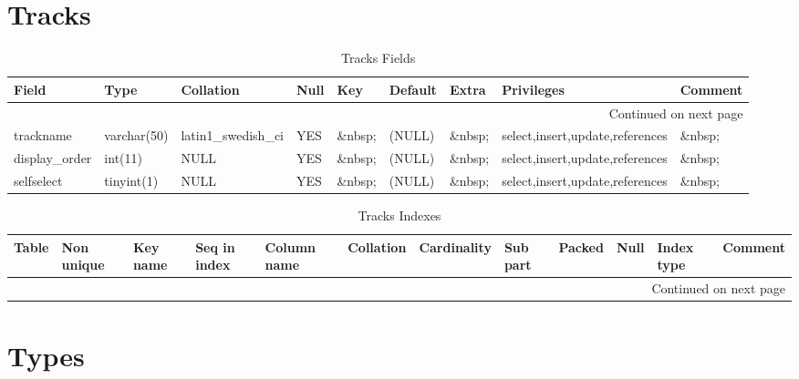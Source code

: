 \documentclass[tablesignature,landscape]{scrartcl}
\begin{document}
\section{Tracks}
\label{sec-32}


\begin{longtable}{|l|l|l|l|l|l|l|l|l|}
\caption{Tracks Fields} \label{tbl:tracksfields}\\
\hline
 Field             &  Type         &  Collation                &  Null     &  Key      &  Default  &  Extra              &  Privileges                       &  Comment \\
\hline
\endhead
\hline\multicolumn{9}{r}{Continued on next page}\
\endfoot
\endlastfoot
\hline
 trackid           &  int(11)      &  NULL                     &  \&nbsp;  &  PRI      &  (NULL)   &  auto\_{}increment  &  select,insert,update,references  &  \&nbsp;  \\
 trackname         &  varchar(50)  &  latin1\_{}swedish\_{}ci  &  YES      &  \&nbsp;  &  (NULL)   &  \&nbsp;            &  select,insert,update,references  &  \&nbsp;  \\
 display\_{}order  &  int(11)      &  NULL                     &  YES      &  \&nbsp;  &  (NULL)   &  \&nbsp;            &  select,insert,update,references  &  \&nbsp;  \\
 selfselect        &  tinyint(1)   &  NULL                     &  YES      &  \&nbsp;  &  (NULL)   &  \&nbsp;            &  select,insert,update,references  &  \&nbsp;  \\
\hline
\end{longtable}


\begin{longtable}{|l|l|l|l|l|l|l|l|l|l|l|l|}
\caption{Tracks Indexes} \label{tbl:trackssindexes}\\
\hline
 Table   &  Non unique  &  Key name  &  Seq in index  &  Column name  &  Collation  &  Cardinality  &  Sub part  &  Packed  &  Null     &  Index type  &  Comment \\
\hline
\endhead
\hline\multicolumn{12}{r}{Continued on next page}\
\endfoot
\endlastfoot
\hline
 Tracks  &           0  &  PRIMARY   &             1  &  trackid      &  A          &           22  &  (NULL)    &  (NULL)  &  \&nbsp;  &  BTREE       &  \&nbsp;  \\
\hline
\end{longtable}
\section{Types}
\label{sec-33}
\end{document}

